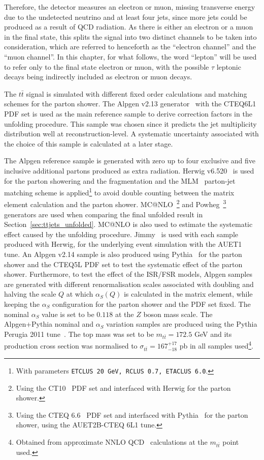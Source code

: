 Therefore, the detector measures an electron or muon, missing transverse energy due to the undetected neutrino
and at least four jets, since more jets
could be produced as a result of QCD radiation.
As there is either an electron or a muon in the final state, this splits the signal into two distinct channels to be taken into consideration,
which are referred to henceforth
as the ``electron channel'' and the ``muon channel''.
In this chapter, for what follows, the word ``lepton'' will be used to refer only to the final state electron or muon, with the possible $\tau$
leptonic decays being indirectly included as electron or muon decays.


The $t\bar{t}$ signal is simulated with different fixed order calculations and matching schemes for the parton shower.
The Alpgen v2.13 generator~\cite{alpgen} 
with the CTEQ6L1~\cite{cteq6} PDF set is used as the main reference sample to derive correction factors in the unfolding procedure.
This sample was chosen since it predicts the jet multiplicity distribution well at reconstruction-level. A systematic
uncertainty associated with the choice of this sample is calculated at a later stage.

The Alpgen reference sample is generated with zero up to four exclusive and five inclusive additional partons
produced as extra radiation. Herwig v6.520~\cite{herwig1,herwig2}
is used for the parton showering and the fragmentation and the MLM~\cite{mlm_matching} parton-jet matching scheme is applied\footnote{
With parameters \texttt{ETCLUS 20 GeV, RCLUS 0.7, ETACLUS 6.0}.} to avoid double counting between the matrix element calculation and the parton shower.
MC@NLO~\cite{mcatnlo_gen}\footnote{Using the CT10~\cite{ct10} PDF set and interfaced with Herwig for the parton shower.} and
Powheg~\cite{powheg}\footnote{Using the CTEQ 6.6~\cite{cteq6} PDF set and interfaced with Pythia~\cite{pythia} for the parton shower,
using the AUET2B-CTEQ 6L1 tune.} generators are used when comparing the final unfolded result in Section~\ref{sec:ttjets_unfolded}.
MC@NLO is also used to estimate the systematic effect caused by
the unfolding procedure. Jimmy~\cite{jimmy} is used with each sample produced with Herwig, for the underlying event simulation with the AUET1 tune.
An Alpgen v2.14 sample is also produced using Pythia~\cite{pythia} for the parton shower and the CTEQ5L PDF set to test
the systematic effect of the parton shower.
Furthermore, to test the effect of the ISR/FSR models, Alpgen samples are generated with different renormalisation scales associated
with doubling and halving the scale $Q$ at which $\alpha_S(Q)$ is calculated in the matrix element, while keeping the $\alpha_S$ configuration for the parton shower and
the PDF set fixed. The nominal $\alpha_S$ value
is set to be $0.118$ at the $Z$
boson mass scale.
The Alpgen+Pythia nominal and $\alpha_S$ variation samples are produced using the Pythia Perugia 2011 tune~\cite{perugia}. The top mass was set to be
$m_{t\bar{t}} = 172.5$ GeV and its production cross section was normalised to $\sigma_{t\bar{t}} = 167^{+17}_{-18}$ pb in all samples used\footnote{Obtained from approximate NNLO QCD~\cite{hathor}
calculations
at the $m_{t\bar{t}}$ point used.}.

